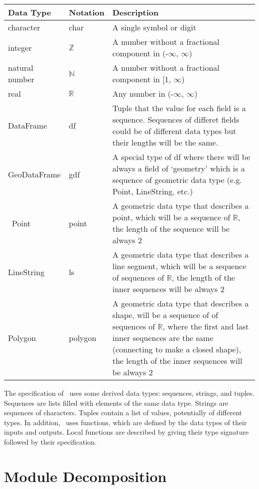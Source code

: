 \documentclass[12pt, titlepage]{article}
\begin{document}
\begin{center}
\renewcommand{\arraystretch}{1.2}
\noindent 
\begin{tabular}{l l p{7.5cm}} 
\toprule 
\textbf{Data Type} & \textbf{Notation} & \textbf{Description}\\ 
\midrule
character & char & A single symbol or digit\\
integer & $\mathbb{Z}$ & A number without a fractional component in (-$\infty$, $\infty$) \\
natural number & $\mathbb{N}$ & A number without a fractional component in [1, $\infty$) \\
real & $\mathbb{R}$ & Any number in (-$\infty$, $\infty$)\\
DataFrame & df & Tuple that the value for each field is a sequence. Sequences of differet fields could be of different data types but their lengths will be the same.\\
GeoDataFrame & gdf & A special type of df where there will be always a field of ‘geometry’ which is a sequence of geometric data type (e.g. Point, LineString, etc.)\\\
Point & point & A geometric data type that describes a point, which will be a sequence of $\mathbb{R}$, the length of the sequence will be always 2 \\ 
LineString & ls & A geometric data type that describes a line segment, which will be a sequence of sequences of $\mathbb{R}$, the length of the inner sequences will be always 2\\
Polygon & polygon & A geometric data type that describes a shape, will be a sequence of of sequences of $\mathbb{R}$, where the first and last inner sequences are the same (connecting to make a closed shape), the length of the inner sequences will be always 2 \\
\bottomrule
\end{tabular} 
\end{center}

\noindent
The specification of \progname \ uses some derived data types: sequences, strings, and
tuples. Sequences are lists filled with elements of the same data type. Strings
are sequences of characters. Tuples contain a list of values, potentially of
different types. In addition, \progname \ uses functions, which
are defined by the data types of their inputs and outputs. Local functions are
described by giving their type signature followed by their specification.

\newpage

\section{Module Decomposition}
\end{document}
